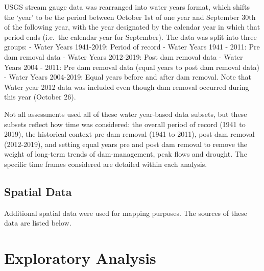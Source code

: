 \documentclass[
  12pt,
]{article}
\begin{document}
USGS stream gauge data was rearranged into water years format, which
shifts the `year' to be the period between October 1st of one year and
September 30th of the following year, with the year designated by the
calendar year in which that period ends (i.e.~the calendar year for
September). The data was split into three groups: - Water Years
1941-2019: Period of record - Water Years 1941 - 2011: Pre dam removal
data - Water Years 2012-2019: Post dam removal data - Water Years 2004 -
2011: Pre dam removal data (equal years to post dam removal data) -
Water Years 2004-2019: Equal years before and after dam removal. Note
that Water year 2012 data was included even though dam removal occurred
during this year (October 26).

Not all assessments used all of these water year-based data subsets, but
these subsets reflect how time was considered: the overall period of
record (1941 to 2019), the historical context pre dam removal (1941 to
2011), post dam removal (2012-2019), and setting equal years pre and
post dam removal to remove the weight of long-term trends of
dam-management, peak flows and drought. The specific time frames
considered are detailed within each analysis.

\hypertarget{spatial-data}{%
\subsection{Spatial Data}\label{spatial-data}}

Additional spatial data were used for mapping purposes. The sources of
these data are listed below.

\newpage

\hypertarget{exploratory-analysis}{%
\section{Exploratory Analysis}\label{exploratory-analysis}}
\end{document}

